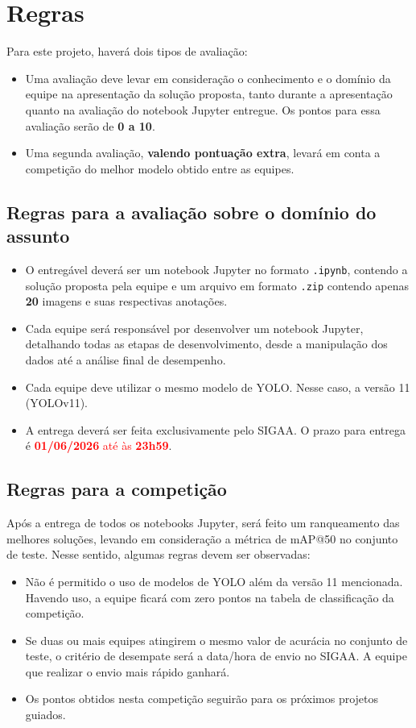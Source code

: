 \documentclass[a4paper,12pt]{article}
\begin{document}
\section{Regras}
Para este projeto, haverá dois tipos de avaliação:

\begin{itemize}
    \item Uma avaliação deve levar em consideração o conhecimento e o domínio da equipe na apresentação da solução proposta, tanto durante a apresentação quanto na avaliação do notebook Jupyter entregue. Os pontos para essa avaliação serão de \textbf{0 a 10}.
    \item Uma segunda avaliação, \textbf{valendo pontuação extra}, levará em conta a competição do melhor modelo obtido entre as equipes.
\end{itemize}

\subsection{Regras para a avaliação sobre o domínio do assunto}

    \begin{itemize}
    \item O entregável deverá ser um notebook Jupyter no formato \texttt{.ipynb}, contendo a solução proposta pela equipe e um arquivo em formato \texttt{.zip} contendo apenas \textbf{20} imagens e suas respectivas anotações.
    \item Cada equipe será responsável por desenvolver um notebook Jupyter, detalhando todas as etapas de desenvolvimento, desde a manipulação dos dados até a análise final de desempenho.
    \item Cada equipe deve utilizar o mesmo modelo de YOLO. Nesse caso, a versão 11 (YOLOv11).
    \item A entrega deverá ser feita exclusivamente pelo SIGAA. O prazo para entrega é \textcolor{red}{\textbf{01/06/2026} até às \textbf{23h59}}.
    \end{itemize}


\subsection{Regras para a competição}
Após a entrega de todos os notebooks Jupyter, será feito um ranqueamento das melhores soluções, levando em consideração a métrica de mAP@50 no conjunto de teste. Nesse sentido, algumas regras devem ser observadas:

\begin{itemize}
    \item Não é permitido o uso de modelos de YOLO além da versão 11 mencionada. Havendo uso, a equipe ficará com zero pontos na tabela de classificação da competição.
    \item Se duas ou mais equipes atingirem o mesmo valor de acurácia no conjunto de teste, o critério de desempate será a data/hora de envio no SIGAA. A equipe que realizar o envio mais rápido ganhará.
    \item Os pontos obtidos nesta competição seguirão para os próximos projetos guiados.
\end{itemize}
\end{document}
